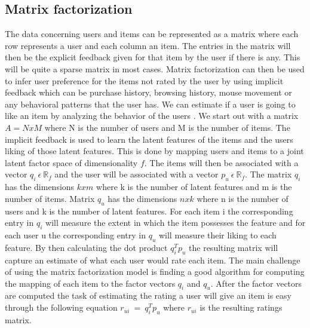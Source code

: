 \subsection{Matrix factorization}\label{bsc::MF}
The data concerning users and items can be represented as a matrix where each row represents a user and each column an item.
The entries in the matrix will then be the explicit feedback given for that item by the user if there is any.
This will be quite a sparse matrix in most cases.
Matrix factorization can then be used to infer user preference for the items not rated by the user by using implicit feedback which can be purchase history, browsing history, mouse movement or any behavioral patterns that the user has.
We can estimate if a user is going to like an item by analyzing the behavior of the users \cite{Matrix-factorization-techniques}.
We start out with a matrix $A = N x M$ where N is the number of users and M is the number of items.
The implicit feedback is used to learn the latent features of the items and the users liking of those latent features.
This is done by mapping users and items to a joint latent factor space of dimensionality $f$.
The items will then be associated with a vector $q_i \: \epsilon \: \mathbb{R}_f$ and the user will be associated with a vector $p_u \: \epsilon \: \mathbb{R}_f$.
The matrix $q_i$ has the dimensions $k x m$ where k is the number of latent features and m is the number of items.
Matrix $q_u$ has the dimensions $n x k$ where n is the number of users and k is the number of latent features.
For each item i the corresponding entry in $q_i$ will measure the extent in which the item possesses the feature and for each user u the corresponding entry in $q_u$ will measure their liking to each feature.
By then calculating the dot product $q_i^T p_u$ the resulting matrix will capture an estimate of what each user would rate each item.
The main challenge of using the matrix factorization model is finding a good algorithm for computing the mapping of each item to the factor vectors $q_i$ and $q_u$.
After the factor vectors are computed the task of estimating the rating a user will give an item is easy through the following equation $r_{ui} \: = \: q_i^T p_u$ where $r_{ui}$ is the resulting ratings matrix.



